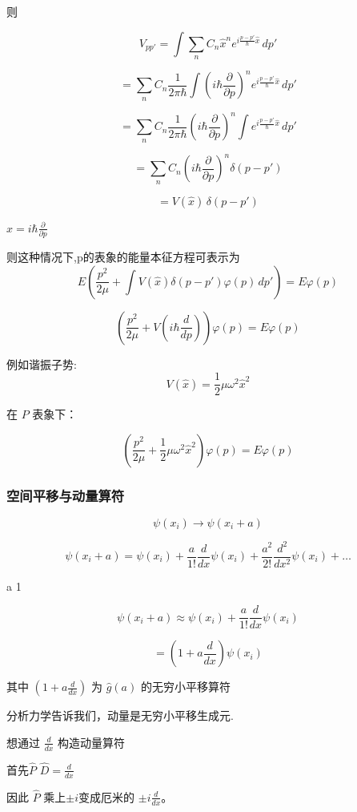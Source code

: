 \documentclass[lang=cn,15pt]{elegantbook}
\begin{document}
则 

\[
V_{pp'} = \int \sum_n C_n \hat{x}^n e^{i \frac{p-p'}{\hbar} \hat{x}} \, dp'
\]

\[
= \sum_n C_n \frac{1}{2\pi \hbar} \int (i \hbar \frac{\partial}{\partial p})^n e^{i \frac{p - p'}{\hbar} \hat{x}} \, dp'
\]

\[
= \sum_n C_n \frac{1}{2\pi \hbar}(i \hbar \frac{\partial}{\partial p})^n\int e^{i \frac{p - p'}{\hbar} \hat{x}} \, dp'
\]

\[
= \sum_n C_n(i \hbar \frac{\partial}{\partial p})^n \delta(p - p')
\]

\[
= V(\hat{x}) \, \delta(p - p')
\]

 $\hat{x} = i \hbar \frac{\partial}{\partial p}$

则这种情况下,p的表象的能量本征方程可表示为
\[
E \left( \frac{p^2}{2\mu} + \int V(\hat{x}) \delta(p - p')  \varphi(p)\, dp' \right) = E \varphi(p)
\]

\[
\left( \frac{p^2}{2\mu} + V(i \hbar \frac{d}{dp}) \right)  \varphi(p) = E  \varphi(p)
\]


例如谐振子势:
\[
V(\hat{x}) =  \frac{1}{2} \mu \omega^2 \hat{x}^2
\]

在 $P$ 表象下：

\[
\left( \frac{p^2}{2\mu} + \frac{1}{2} \mu \omega^2 \hat{x}^2 \right) \varphi(p) = E \varphi(p)
\]

\subsubsection{空间平移与动量算符}
\[
\psi(x_i) \rightarrow \psi(x_i + a)
\]

\[
\psi(x_i + a) = \psi(x_i) + \frac{a}{1!} \frac{d}{dx} \psi(x_i) + \frac{a^2}{2!} \frac{d^2}{dx^2} \psi(x_i) + \ldots
\]

 a  1 

\[
\psi(x_i + a) \approx \psi(x_i) + \frac{a}{1!} \frac{d}{dx} \psi(x_i)
\]

\[
= (1 + a \frac{d}{dx}) \psi(x_i)
\]

$\text{其中 } (1 + a \frac{d}{dx}) \text{ 为 } \hat{g}(a) \text{ 的无穷小平移算符}$

分析力学告诉我们，动量是无穷小平移生成元.

想通过 $\frac{d}{dx}$ 构造动量算符

首先$  \hat{P}$ $ \hat{D} = \frac{d}{dx}$ 

因此 $\hat{P}$ 乘上$\pm i$变成厄米的 $\pm i \frac{d}{dx}$。
\end{document}
